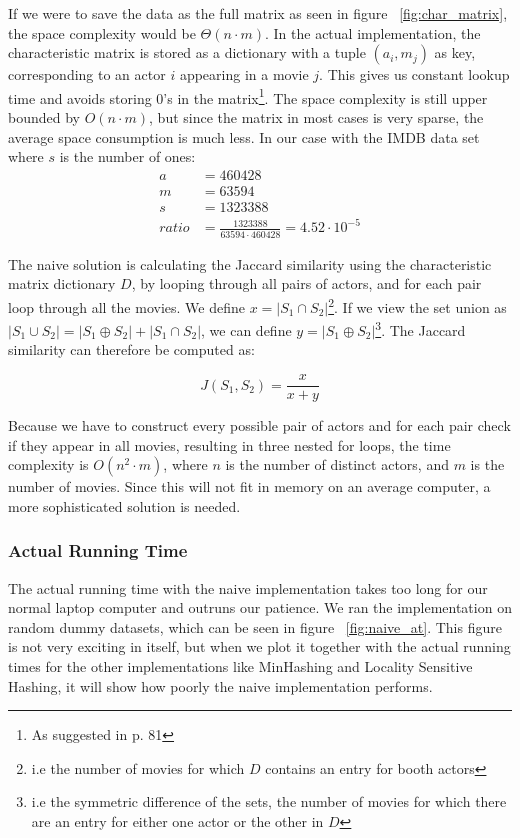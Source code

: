 \documentclass[a4paper,11pt]{article}
\begin{document}
If we were to save the data as the full matrix as seen in figure ~\ref{fig:char_matrix}, the space complexity would be $\Theta (n \cdot m)$. In the actual implementation, the characteristic matrix is stored as a dictionary with a tuple $(a_i,m_j)$ as key, corresponding to an actor $i$ appearing in a movie $j$. This gives us constant lookup time and avoids storing 0's in the matrix\footnote{As suggested in \cite{book:mmds} p. 81}. The space complexity is still upper bounded by $O(n \cdot m)$, but since the matrix in most cases is very sparse, the average space consumption is much less. In our case with the IMDB data set where $s$ is the number of ones:
\begin{equation}
\begin{aligned}
a &= 460428\\
m &= 63594\\
s &= 1323388\\
ratio &= \frac{1323388}{63594 \cdot 460428} = 4.52\cdot 10^{-5}
\end{aligned}
\end{equation}

The naive solution is calculating the Jaccard similarity using the characteristic matrix dictionary $D$, by looping through all pairs of actors, and for each pair loop through all the movies. We define $x = |S_1 \cap S_2|$\footnote{i.e the number of movies for which $D$ contains an entry for booth actors}. If we view the set union as $|S_1 \cup S_2| = |S_1 \oplus S_2| + |S_1 \cap S_2|$, we can define $y = |S_1 \oplus S_2|$\footnote{i.e the symmetric difference of the sets, the number of movies for which there are an entry for either one actor or the other in $D$}. The Jaccard similarity can therefore be computed as:

\begin{equation}
J(S_1,S_2) = \frac{x}{x+y}
\end{equation}

Because we have to construct every possible pair of actors and for each pair check if they appear in all movies, resulting in three nested for loops, the time complexity is $O(n^2 \cdot m)$, where $n$ is the number of distinct actors, and $m$ is the number of movies. Since this will not fit in memory on an average computer, a more sophisticated solution is needed. \\

\subsubsection{Actual Running Time}
The actual running time with the naive implementation takes too long for our normal laptop computer and outruns our patience. We ran the implementation on random dummy datasets, which can be seen in figure ~\ref{fig:naive_at}. This figure is not very exciting in itself, but when we plot it together with the actual running times for the other implementations like MinHashing and Locality Sensitive Hashing, it will show how poorly the naive implementation performs. \\
\end{document}
